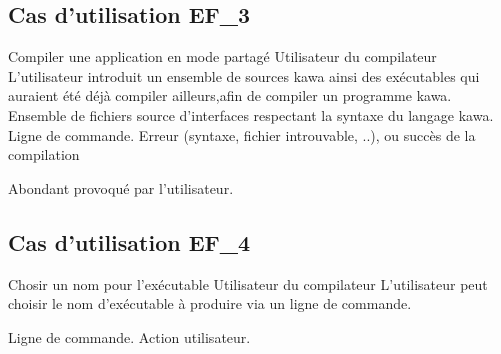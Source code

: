 \subsection{Cas d'utilisation EF\_3}
\fiche
{Compiler une application en mode partagé}                    %
{Utilisateur du compilateur}                               %
{                                                %
  L’utilisateur introduit un ensemble de sources kawa
  ainsi des exécutables qui auraient été déjà compiler ailleurs,afin de compiler un programme kawa.
}
{
	Ensemble de fichiers source d'interfaces
	respectant la syntaxe du langage kawa. 
}                                                %
{Ligne de commande.}                             %
{Erreur (syntaxe, fichier introuvable, ..), ou 
 succès de la compilation}                       %
{                                                %
  
}{} %
{Abondant provoqué par l'utilisateur.} %


\subsection{Cas d'utilisation EF\_4}
\fiche
{Chosir un nom pour l'exécutable}                      %
{Utilisateur du compilateur}                               %
{                                                %
    L'utilisateur peut choisir le nom d'exécutable à produire via un ligne de commande. 
}
{
	
}                                                %
{Ligne de commande.}                             %
{Action utilisateur.}                       %
{                                                %
 
}{} %
{} %

